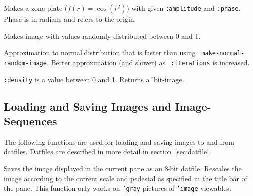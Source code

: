 \begin{description}
\item{}
Makes a zone plate ($f(r) = \cos(r^2)$) with given {\tt :amplitude}
and {\tt :phase}. Phase is in radians and refers to the origin.

\item{}

\item{}

\item{}

\item{}

\item{}
Makes image with values randomly distributed between 0 and 1.

\item{}
Approximation to normal distribution that is faster than using {\tt
make-normal-random-image}. Better approximation (and slower) as {\tt
:iterations} is increased. 

\item{}
{\tt :density} is a value between 0 and 1.  Returns a 'bit-image.

\item{}
\end{description}


\subsection{Loading and Saving Images and Image-Sequences}

The following functions are used for loading and saving images to and
from datfiles.  Datfiles are described in more detail in section~\ref{sec:datfile}.

\begin{description}
\item{}
\item{}
\item{}
\item{}

\item{}
Saves the image displayed in the current pane as an 8-bit datfile.
Rescales the image according to the current scale and pedestal as
specified in the title bar of the pane.  This function only works on
{\tt 'gray} pictures of {\tt 'image} viewables.
\end{description}


